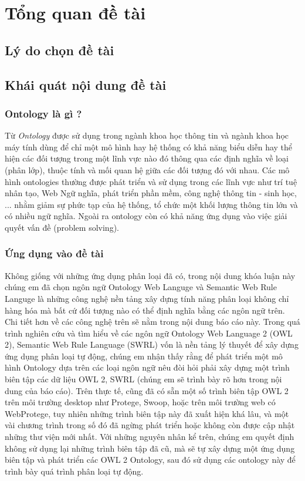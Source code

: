 \chapter{Tổng quan đề tài}
\section{Lý do chọn đề tài}

\section{Khái quát nội dung đề tài}
\subsection{Ontology là gì ?}
Từ \textit{Ontology} được sử dụng trong ngành khoa học thông tin và ngành khoa học máy tính dùng để chỉ một mô hình hay hệ thống có khả năng biểu diễn hay thể hiện các đối tượng trong một lĩnh vực nào đó thông qua các định nghĩa về loại (phân lớp), thuộc tính và mối quan hệ giữa các đối tượng đó với nhau. Các mô hình ontologies thường được phát triển và sử dụng trong các lĩnh vực như trí tuệ nhân tạo, Web Ngữ nghĩa, phát triển phần mềm, công nghệ thông tin - sinh học, ... nhằm giảm sự phức tạp của hệ thống, tổ chức một khối lượng thông tin lớn và có nhiều ngữ nghĩa. Ngoài ra ontology còn có khả năng ứng dụng vào việc giải quyết vấn đề (problem solving).
\subsection{Ứng dụng vào đề tài}
Không giống với những ứng dụng phân loại đã có, trong nội dung khóa luận này chúng em đã chọn ngôn ngữ Ontology Web Languge và Semantic Web Rule Languge là những công nghệ nền tảng xây dựng tính năng phân loại không chỉ hàng hóa mà bất cứ đối tượng nào có thể định nghĩa bằng các ngôn ngữ trên. Chi tiết hơn về các công nghệ trên sẽ nằm trong nội dung báo cáo này. 
Trong quá trình nghiên cứu và tìm hiểu về các ngôn ngữ Ontology Web Language 2 (OWL 2), Semantic Web Rule Language (SWRL) vốn là nền tảng lý thuyết để xây dựng ứng dụng phân loại tự động, chúng em nhận thấy rằng để phát triển một mô hình Ontology dựa trên các loại ngôn ngữ nêu đòi hỏi phải xây dựng một trình biên tập các dữ liệu OWL 2, SWRL (chúng em sẽ trình bày rõ hơn trong nội dung của báo cáo). Trên thực tế, cũng đã có sẵn một số trình biên tập OWL 2 trên môi trường desktop như Protege, Swoop, hoặc trên môi trường web có WebProtege, tuy nhiên những trình biên tập này đã xuất hiện khá lâu, và một vài chương trình trong số đó đã ngừng phát triển hoặc không còn được cập nhật những thư viện mới nhất. Với những nguyên nhân kể trên, chúng em quyết định không sử dụng lại những trình biên tập đã cũ, mà sẽ tự xây dựng một ứng dụng biên tập và phát triển các OWL 2 Ontology, sau đó sử dụng các ontology này để trình bày quá trình phân loại tự động.
